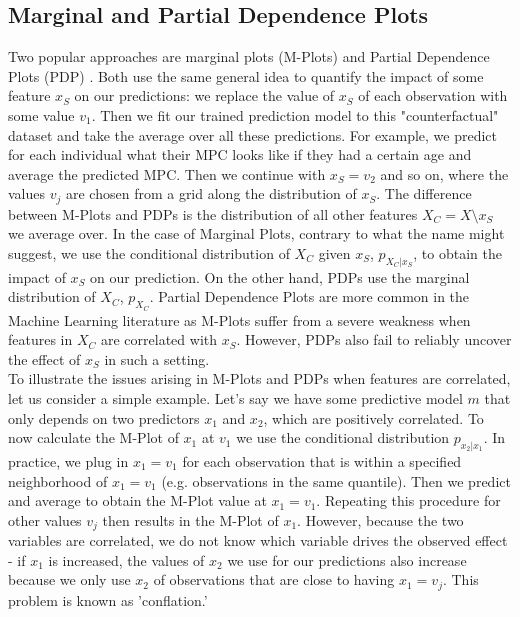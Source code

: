 \subsection{Marginal and Partial Dependence Plots}
Two popular approaches are marginal plots (M-Plots) \cite{molnar_2021} and Partial Dependence Plots (PDP) \citep{friedman_2001}. Both use the same general idea to quantify the impact of some feature $x_S$ on our predictions: we replace the value of $x_S$ of each observation with some value $v_1$. Then we fit our trained prediction model to this "counterfactual" dataset and take the average over all these predictions. For example, we predict for each individual what their MPC looks like if they had a certain age and average the predicted MPC. Then we continue with $x_S=v_2$ and so on, where the values $v_j$ are chosen from a grid along the distribution of $x_S$. The difference between M-Plots and PDPs is the distribution of all other features $X_C=X\setminus x_S$ we average over. In the case of Marginal Plots, contrary to what the name might suggest, we use the conditional distribution of $X_C$ given $x_S$, $p_{X_C|x_S}$, to obtain the impact of $x_S$ on our prediction. On the other hand, PDPs use the marginal distribution of $X_C$, $p_{X_C}$. 
Partial Dependence Plots are more common in the Machine Learning literature as M-Plots suffer from a severe weakness when features in $X_C$ are correlated with $x_S$. However, PDPs also fail to reliably uncover the effect of $x_S$ in such a setting. \\
To illustrate the issues arising in M-Plots and PDPs when features are correlated, let us consider a simple example. Let's say we have some predictive model $m$ that only depends on two predictors $x_1$ and $x_2$, which are positively correlated. To now calculate the M-Plot of $x_1$ at $v_1$ we use the conditional distribution $p_{x_2|x_1}$. In practice, we plug in $x_1=v_1$ for each observation that is within a specified neighborhood of $x_1=v_1$ (e.g. observations in the same quantile). Then we predict and average to obtain the M-Plot value at $x_1=v_1$. Repeating this procedure for other values $v_j$ then results in the M-Plot of $x_1$. However, because the two variables are correlated, we do not know which variable drives the observed effect - if $x_1$  is increased, the values of $x_2$  we use for our predictions also increase because we only use $x_2$ of observations that are close to having $x_1=v_j$. This problem is known as 'conflation.' \\
